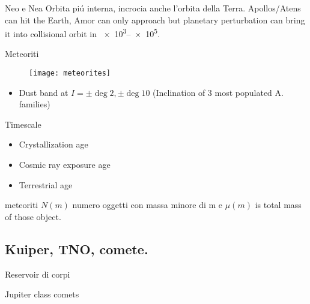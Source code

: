\begin{wordonframe}{Neo e Nea}
Orbita pi\'u interna, incrocia anche l'orbita della Terra. Apollos/Atens can hit the Earth, Amor can only approach but planetary perturbation can bring it into collisional orbit in \SIrange{e3}{e5}{\year}. 
\end{wordonframe}

\begin{frame}{Meteoriti}
\begin{figure}[!ht]\texttt{[image: meteorites]}\end{figure}
\begin{itemize}
\item Dust band at $I=\pm\deg{2},\pm\deg{10}$ (Inclination of 3 most populated A. families)
\end{itemize}
\begin{block}{Timescale}
\begin{itemize}
\item Crystallization age
\item Cosmic ray exposure age
\item Terrestrial age
\end{itemize}
\end{block}
\end{frame}

\begin{wordonframe}{meteoriti}
$N(m)$ numero oggetti con massa minore di m e $\mu(m)$ is total mass of those object.
\end{wordonframe}

\subsection{Kuiper, TNO, comete.}

\begin{frame}{Reservoir di corpi}

\end{frame}

\begin{wordonframe}{Jupiter class comets}

\end{wordonframe}

